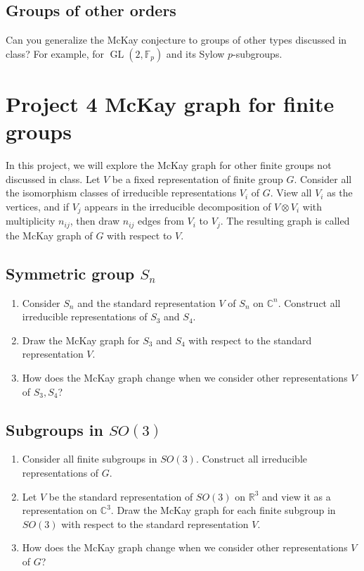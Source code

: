 \documentclass[12pt]{article}
\newcommand\cc{\mathbb{C}}
\newcommand\F{\mathbb{F}}
\newcommand\rr{{\mathbb{R}}}
\DeclareMathOperator{\GL}{GL}
\theoremstyle{definition}
\theoremstyle{remark}
\begin{document}
\subsection{Groups of other orders}
Can you generalize the McKay conjecture to groups of other types discussed in class? For example, for $\GL(2, \F_p)$ and its Sylow $p$-subgroups. 


\section{Project 4 McKay graph for finite groups}
In this project, we will explore the McKay graph for other finite groups not discussed in class. Let $V$ be a fixed representation of finite group $G$. Consider all the isomorphism classes of irreducible representations $V_i$ of $G$. View all $V_i$ as the vertices, and if $V_j$ appears in the irreducible decomposition of $V\otimes V_i$ with multiplicity $n_{ij}$, then draw $n_{ij}$ edges from $V_i$ to $V_j$. The resulting graph is called the McKay graph of $G$ with respect to $V$.

\subsection{Symmetric group $S_n$}
\begin{enumerate}
\item Consider $S_n$ and the standard representation $V$ of $S_n$ on $\cc^n$. Construct all irreducible representations of $S_3$ and $S_4$. 

\item Draw the McKay graph for $S_3$ and $S_4$ with respect to the standard representation $V$.

\item How does the McKay graph change when we consider other representations $V$ of $S_3, S_4$? 

\end{enumerate}

\subsection{Subgroups in $SO(3)$}
\begin{enumerate}
    \item Consider all finite subgroups in $SO(3)$. Construct all irreducible representations of $G$.
    \item Let $V$ be the standard representation of $SO(3)$ on $\rr^3$ and view it as a representation on $\cc^3$. Draw the McKay graph for each finite subgroup in $SO(3)$ with respect to the standard representation $V$.
    \item How does the McKay graph change when we consider other representations $V$ of $G$? 
\end{enumerate}
\end{document}
